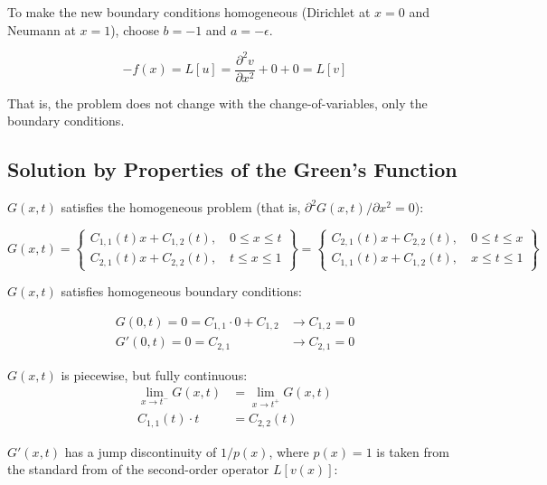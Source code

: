 \documentclass[10pt]{article}
\begin{document}
To make the new boundary conditions homogeneous (Dirichlet at $x=0$ and Neumann at $x=1$), choose $b=-1$ and $a=-\epsilon$.

$$
    -f(x) = L[u] = \frac{\partial^2 v}{\partial x^2} + 0 + 0 = L[v]
$$

That is, the problem does not change with the change-of-variables, only the boundary conditions.

\subsection{Solution by Properties of the Green's Function}
$$\quad$$
$G(x,t)$ satisfies the homogeneous problem (that is, $\partial^2 G(x,t) / \partial x^2 = 0$):
    
\begin{equation}
    G(x,t) = 
    \left\{ \begin{matrix}
        C_{1,1}(t) x + C_{1,2}(t), \quad 0 \le x \le t \\ 
        C_{2,1}(t) x + C_{2,2}(t), \quad t \le x \le 1
    \end{matrix} \right\}
    =
    \left\{ \begin{matrix}
        C_{2,1}(t) x + C_{2,2}(t), \quad 0 \le t \le x \\ 
        C_{1,1}(t) x + C_{1,2}(t), \quad x \le t \le 1
    \end{matrix} \right\} 
\end{equation}

$G(x,t)$ satisfies homogeneous boundary conditions:
    
\begin{equation}
    \begin{split}
        G(0,t) = 0 = C_{1,1} \cdot 0 + C_{1,2}  &\xrightarrow{ } C_{1,2} = 0 \\
        G'(0,t) = 0 = C_{2,1} \quad \quad  &\xrightarrow{ } C_{2,1} = 0
    \end{split}
\end{equation}

$G(x,t)$ is piecewise, but fully continuous:
\begin{equation}
    \label{eqn:continuous}
    \begin{split}
        \lim _{ x \rightarrow t^- }{G(x,t)} &= \lim _{ x \rightarrow t^+ }{G(x,t)} \\
        C_{1,1}(t)\cdot t &= C_{2,2}(t)
    \end{split}
\end{equation}

$G'(x,t)$ has a jump discontinuity of $1/p(x)$, where $p(x)=1$ is taken from the standard from of the second-order operator $L[v(x)]$:
    
\end{document}
